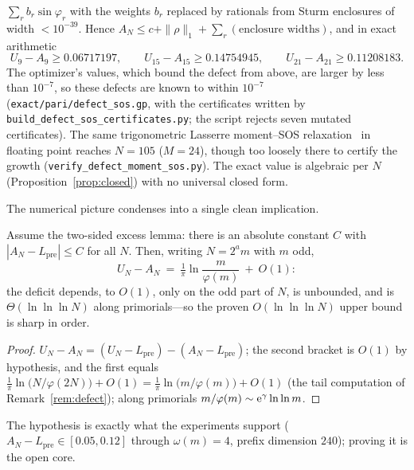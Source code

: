 \begin{remark}
$\sum_rb_r\sin\varphi_r$ with the weights $b_r$ replaced by rationals from Sturm enclosures of width
$<10^{-39}$. Hence $A_N\le c+\|\rho\|_1+\sum_r(\text{enclosure widths})$, and in exact arithmetic
\[
  U_9-A_9\ge0.06717197,\qquad U_{15}-A_{15}\ge0.14754945,\qquad U_{21}-A_{21}\ge0.11208183 .
\]
The optimizer's values, which bound the defect from above, are larger by less than $10^{-7}$, so these
defects are known to within $10^{-7}$ (\texttt{exact/pari/defect\_sos.gp}, with the certificates written by
\texttt{build\_defect\_sos\_certificates.py}; the script rejects seven mutated certificates). The same
trigonometric Lasserre moment--SOS relaxation~\cite{Lasserre} in floating point reaches $N=105$ ($M=24$), though too
loosely there to certify the growth (\texttt{verify\_defect\_moment\_sos.py}). The exact value is algebraic per
$N$ (Proposition~\ref{prop:closed}) with no universal closed form.
\end{remark}

The numerical picture condenses into a single clean implication.

\begin{proposition}\label{prop:defect-cond}
Assume the two-sided excess lemma: there is an absolute constant $C$ with
$|A_N-L_{\mathrm{pre}}|\le C$ for all $N$. Then, writing $N=2^am$ with $m$ odd,
\[
  U_N-A_N\ =\ \tfrac1\pi\ln\frac{m}{\varphi(m)}\ +\ O(1):
\]
the deficit depends, to $O(1)$, only on the odd part of $N$, is unbounded, and is
$\Theta(\ln\ln\ln N)$ along primorials---so the proven $O(\ln\ln\ln N)$ upper bound is sharp in order.
\end{proposition}

\begin{proof}
$U_N-A_N=(U_N-L_{\mathrm{pre}})-(A_N-L_{\mathrm{pre}})$; the second bracket is $O(1)$ by hypothesis, and
the first equals $\tfrac1\pi\ln\bigl(N/\varphi(2N)\bigr)+O(1)=\tfrac1\pi\ln\bigl(m/\varphi(m)\bigr)+O(1)$
(the tail computation of Remark~\ref{rem:defect}); along primorials $m/\varphi(m)\sim\mathrm{e}^\gamma\ln\ln m$.
\end{proof}

\noindent The hypothesis is exactly what the experiments support ($A_N-L_{\mathrm{pre}}\in[0.05,0.12]$
through $\omega(m)=4$, prefix dimension $240$); proving it is the open core.

